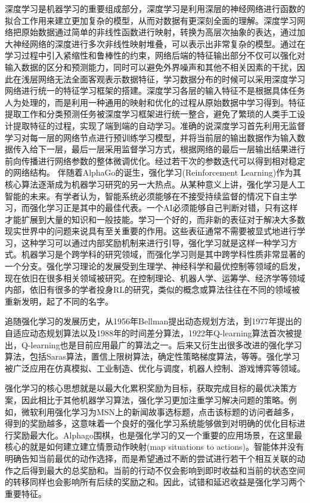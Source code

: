深度学习是机器学习的重要组成部分，深度学习是利用深层的神经网络进行函数的拟合工作用来建立更加复杂的模型，从而对数据有更深刻全面的理解。深度学习网络把原始数据通过简单的非线性函数进行映射，转换为高层次抽象的表达，通过加大神经网络的深度进行多次非线性映射堆叠，可以表示出非常复杂的模型。通过在学习过程中引入紧缩性和鲁棒性的约束，网络后端的特征输出部分不仅可以强化对输入数据的区分和预测能力，同时可以避免外界噪声和其他不相关因素的干扰，因此在浅层网络无法全面客观表示数据特征，学习数据分布的时候可以采用深度学习网络进行统一的特征学习框架的搭建。深度学习各层的输入特征不是根据具体任务人为处理的，而是利用一种通用的映射和优化的过程从原始数据中学习得到。特征提取工作和分类预测任务被深度学习框架进行统一整合，避免了繁琐的人类手工设计提取特征的过程，实现了端到端的自动学习。准确的说深度学习首先利用无监督学习对每一层的网络节点进行预训练学习模型，并将当前层的输出数据作为输入数据传入给下一层，最后一层采用监督学习方式，根据网络的最后一层输出结果进行前向传播进行网络参数的整体微调优化。经过若干次的参数迭代可以得到相对稳定的网络结构。
伴随着AlphaGo的诞生，强化学习(Reinforcement Learning)作为其核心算法逐渐成为机器学习研究的另一大热点。从某种意义上讲，强化学习是人工智能的未来。有学者认为，智能系统必须能够在不接受持续监督的情况下自主学习，而强化学习正是其中的最佳代表。一个AI必须能够自己判断对错，只有这样才能扩展到大量的知识和一般技能。学习一个好的，而非新的表征对于解决大多数现实世界中的问题来说具有至关重要的作用。这些表征通常不需要被显式地进行学习，这种学习可以通过内部奖励机制来进行引导，强化学习就是这样一种学习方式。机器学习是个跨学科的研究领域，而强化学习则是其中跨学科性质非常显著的一个分支。强化学习理论的发展受到生理学、神经科学和最优控制等领域的启发，现在依旧在很多相关领域被研究。在控制理论、机器人学、运筹学、经济学等领域内部，依旧有很多的学者投身RL的研究，类似的概念或算法往往在不同的领域被重新发明，起了不同的名字。

追随强化学习的发展历史，从1956年Bellman提出动态规划方法，到1977年提出的自适应动态规划算法以及1988年的时间差分算法，1922年Q-learning算法首次被提出，Q-learning也是目前应用最广的算法之一。后来又衍生出很多改进的强化学习算法，包括Saras算法，置信上限树算法，确定性策略梯度算法，等等。强化学习被广泛应用在仿真模拟\cite{傅启明2014一种基于线性函数逼近的离策略}、工业制造\cite{高阳2007平均奖赏强化学习算法研究}、优化与调度\cite{魏英姿2005一种基于强化学习的作业车间动态调度方法}，机器人控制\cite{Ipek2008Self}、游戏博弈\cite{Tesauro1944TD}等领域。

强化学习的核心思想就是以最大化累积奖励为目标，获取完成目标的最优决策方案，因此相比于其他机器学习算法，强化学习更加注重学习解决问题的策略。例如，微软利用强化学习为MSN上的新闻故事选标题，点击该标题的访问者越多，得到的奖励越多，这意味着一个良好的强化学习系统能够做到对明确的优化目标进行奖励最大化。Alphago围棋，也是强化学习的又一个重要的应用场景，在这里最核心的就是如何建立建立情景\raisebox{0.3mm}{----}动作映射(map situations to actions)。智能体并没有明确告知当前最优的动作选择，而是希望通过不断的尝试进行若干个相互关联的动作之后得到最大的总奖励和。当前的行动不仅会影响到即时收益和当前的状态空间的转移同样也会影响所有后续的奖励之和。因此，试错和延迟收益是强化学习两个重要特征。

